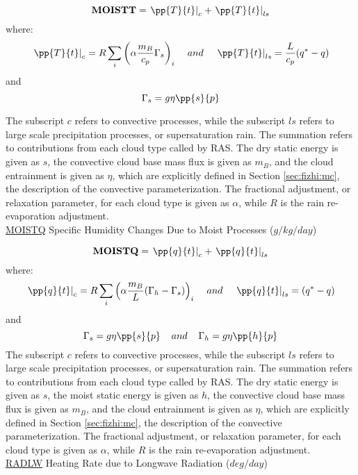 \noindent
\[
{\bf MOISTT} = \left. {\pp{T}{t}}\right|_{c} + \left. {\pp{T}{t}} \right|_{ls}
\]
where:
\[
\left.{\pp{T}{t}}\right|_{c} = R \sum_i \left( \alpha { m_B \over c_p} \Gamma_s \right)_i 
\hspace{.4cm} and 
\hspace{.4cm} \left.{\pp{T}{t}}\right|_{ls} = {L \over c_p } (q^*-q)
\]
and
\[
\Gamma_s = g \eta \pp{s}{p}
\]

\noindent
The subscript $c$ refers to convective processes, while the subscript $ls$ refers to large scale
precipitation processes, or supersaturation rain. 
The summation refers to contributions from each cloud type called by RAS.  
The dry static energy is given 
as $s$, the convective cloud base mass flux is given as $m_B$, and the cloud entrainment is
given as $\eta$, which are explicitly defined in Section \ref{sec:fizhi:mc}, 
the description of the convective parameterization.  The fractional adjustment, or relaxation
parameter, for each cloud type is given as $\alpha$, while
$R$ is the rain re-evaporation adjustment.
\\

\noindent
{ \underline {MOISTQ} Specific Humidity Changes Due to Moist Processes ($g/kg/day$) } 

\noindent
\[
{\bf MOISTQ} = \left. {\pp{q}{t}}\right|_{c} + \left. {\pp{q}{t}} \right|_{ls}
\]
where:
\[
\left.{\pp{q}{t}}\right|_{c} = R \sum_i \left( \alpha { m_B \over {L}}(\Gamma_h-\Gamma_s) \right)_i 
\hspace{.4cm} and 
\hspace{.4cm} \left.{\pp{q}{t}}\right|_{ls} = (q^*-q)
\]
and
\[
\Gamma_s = g \eta \pp{s}{p}\hspace{.4cm} and \hspace{.4cm}\Gamma_h = g \eta \pp{h}{p}
\]
\noindent
The subscript $c$ refers to convective processes, while the subscript $ls$ refers to large scale
precipitation processes, or supersaturation rain. 
The summation refers to contributions from each cloud type called by RAS.  
The dry static energy is given as $s$, 
the moist static energy is given as $h$, 
the convective cloud base mass flux is given as $m_B$, and the cloud entrainment is
given as $\eta$, which are explicitly defined in Section \ref{sec:fizhi:mc}, 
the description of the convective parameterization.  The fractional adjustment, or relaxation
parameter, for each cloud type is given as $\alpha$, while
$R$ is the rain re-evaporation adjustment.
\\

\noindent
{ \underline {RADLW} Heating Rate due to Longwave Radiation ($deg/day$) }

